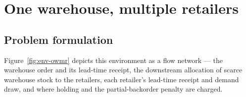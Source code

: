 \documentclass[11pt]{article}
\begin{document}
\section{One warehouse, multiple retailers}
\label{sec:owmr}

\subsection{Problem formulation}
\label{sec:owmr-formulation}

Figure~\ref{fig:env-owmr} depicts this environment as a flow network --- the warehouse order and
its lead-time receipt, the downstream allocation of scarce warehouse stock to the retailers, each
retailer's lead-time receipt and demand draw, and where holding and the partial-backorder penalty
are charged.
\end{document}
